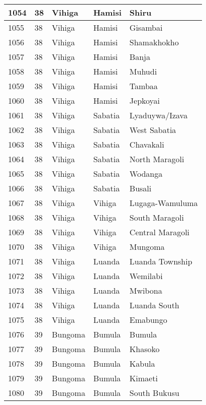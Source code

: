 \begin{table}[!ht]
\begin{tabular}{|l|l|l|l|l|}
        1054 & 38 & Vihiga & Hamisi & Shiru \\ \hline
        1055 & 38 & Vihiga & Hamisi & Gisambai \\ \hline
        1056 & 38 & Vihiga & Hamisi & Shamakhokho \\ \hline
        1057 & 38 & Vihiga & Hamisi & Banja \\ \hline
        1058 & 38 & Vihiga & Hamisi & Muhudi \\ \hline
        1059 & 38 & Vihiga & Hamisi & Tambaa \\ \hline
        1060 & 38 & Vihiga & Hamisi & Jepkoyai \\ \hline
        1061 & 38 & Vihiga & Sabatia & Lyaduywa/Izava \\ \hline
        1062 & 38 & Vihiga & Sabatia & West Sabatia \\ \hline
        1063 & 38 & Vihiga & Sabatia & Chavakali \\ \hline
        1064 & 38 & Vihiga & Sabatia & North Maragoli \\ \hline
        1065 & 38 & Vihiga & Sabatia & Wodanga \\ \hline
        1066 & 38 & Vihiga & Sabatia & Busali \\ \hline
        1067 & 38 & Vihiga & Vihiga & Lugaga-Wamuluma \\ \hline
        1068 & 38 & Vihiga & Vihiga & South Maragoli \\ \hline
        1069 & 38 & Vihiga & Vihiga & Central Maragoli \\ \hline
        1070 & 38 & Vihiga & Vihiga & Mungoma \\ \hline
        1071 & 38 & Vihiga & Luanda & Luanda Township \\ \hline
        1072 & 38 & Vihiga & Luanda & Wemilabi \\ \hline
        1073 & 38 & Vihiga & Luanda & Mwibona \\ \hline
        1074 & 38 & Vihiga & Luanda & Luanda South \\ \hline
        1075 & 38 & Vihiga & Luanda & Emabungo \\ \hline
        1076 & 39 & Bungoma & Bumula & Bumula \\ \hline
        1077 & 39 & Bungoma & Bumula & Khasoko \\ \hline
        1078 & 39 & Bungoma & Bumula & Kabula \\ \hline
        1079 & 39 & Bungoma & Bumula & Kimaeti \\ \hline
        1080 & 39 & Bungoma & Bumula & South Bukusu \\ \hline

\end{tabular}
\end{table}
